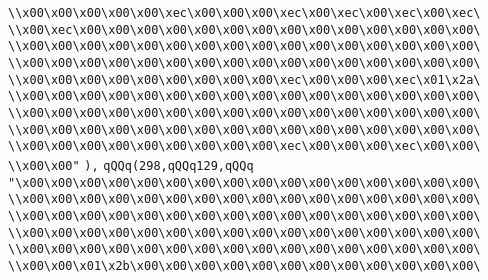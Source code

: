 \verb|\\x00\x00\x00\x00\x00\xec\x00\x00\x00\xec\x00\xec\x00\xec\x00\xec\|\newline
\verb|\\x00\xec\x00\x00\x00\x00\x00\x00\x00\x00\x00\x00\x00\x00\x00\x00\|\newline
\verb|\\x00\x00\x00\x00\x00\x00\x00\x00\x00\x00\x00\x00\x00\x00\x00\x00\|\newline
\verb|\\x00\x00\x00\x00\x00\x00\x00\x00\x00\x00\x00\x00\x00\x00\x00\x00\|\newline
\verb|\\x00\x00\x00\x00\x00\x00\x00\x00\x00\xec\x00\x00\x00\xec\x01\x2a\|\newline
\verb|\\x00\x00\x00\x00\x00\x00\x00\x00\x00\x00\x00\x00\x00\x00\x00\x00\|\newline
\verb|\\x00\x00\x00\x00\x00\x00\x00\x00\x00\x00\x00\x00\x00\x00\x00\x00\|\newline
\verb|\\x00\x00\x00\x00\x00\x00\x00\x00\x00\x00\x00\x00\x00\x00\x00\x00\|\newline
\verb|\\x00\x00\x00\x00\x00\x00\x00\x00\x00\xec\x00\x00\x00\xec\x00\x00\|\newline
\verb|\\x00\x00"|\newline
\verb|),|\newline
\verb|qQQq(298,qQQq129,qQQq|\newline
\verb|"\x00\x00\x00\x00\x00\x00\x00\x00\x00\x00\x00\x00\x00\x00\x00\x00\|\newline
\verb|\\x00\x00\x00\x00\x00\x00\x00\x00\x00\x00\x00\x00\x00\x00\x00\x00\|\newline
\verb|\\x00\x00\x00\x00\x00\x00\x00\x00\x00\x00\x00\x00\x00\x00\x00\x00\|\newline
\verb|\\x00\x00\x00\x00\x00\x00\x00\x00\x00\x00\x00\x00\x00\x00\x00\x00\|\newline
\verb|\\x00\x00\x00\x00\x00\x00\x00\x00\x00\x00\x00\x00\x00\x00\x00\x00\|\newline
\verb|\\x00\x00\x01\x2b\x00\x00\x00\x00\x00\x00\x00\x00\x00\x00\x00\x00\|\newline
